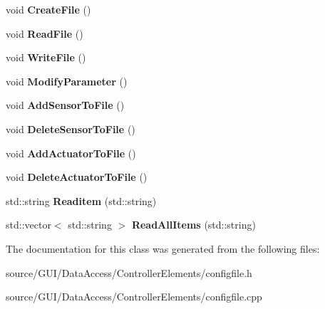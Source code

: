 \begin{DoxyCompactItemize}
\item 
void {\bfseries Create\+File} ()\label{class_config_file_a2947fe8efebf257851822ce7d69a9574}

\item 
void {\bfseries Read\+File} ()\label{class_config_file_add3a2ec121c5a1febe4933c8522d35aa}

\item 
void {\bfseries Write\+File} ()\label{class_config_file_acd51dcebf288cedfeb40046df53f79f6}

\item 
void {\bfseries Modify\+Parameter} ()\label{class_config_file_a158aa52c87ad6af128b3a47d63cf4c8e}

\item 
void {\bfseries Add\+Sensor\+To\+File} ()\label{class_config_file_af6340cffd3dab3b0251147f3b6fb8695}

\item 
void {\bfseries Delete\+Sensor\+To\+File} ()\label{class_config_file_a24b3d540b3f6ffda618d07709b16db5b}

\item 
void {\bfseries Add\+Actuator\+To\+File} ()\label{class_config_file_a9c4786d9969b9b86f5955c011bd7529c}

\item 
void {\bfseries Delete\+Actuator\+To\+File} ()\label{class_config_file_acccbff3ff6562788c5781bcc97509b45}

\item 
std\+::string {\bfseries Readitem} (std\+::string)\label{class_config_file_a95ff6c4d12264959cdeed10c20ba9bbb}

\item 
std\+::vector$<$ std\+::string $>$ {\bfseries Read\+All\+Items} (std\+::string)\label{class_config_file_a54b9c615fed456b3b0df129ca88378f5}

\end{DoxyCompactItemize}


The documentation for this class was generated from the following files\+:\begin{DoxyCompactItemize}
\item 
source/\+G\+U\+I/\+Data\+Access/\+Controller\+Elements/configfile.\+h\item 
source/\+G\+U\+I/\+Data\+Access/\+Controller\+Elements/configfile.\+cpp\end{DoxyCompactItemize}
